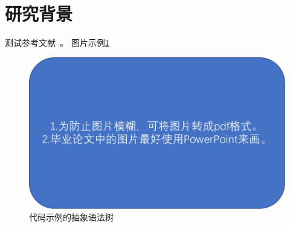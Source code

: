 \section{研究背景}
测试参考文献~\cite{ASE10Rule}。
图片示例\ref{fig:fig1}

\begin{figure}[htb]
    \centering
    \includegraphics[width=\textwidth]{image/fig1.pdf}
    \caption{代码示例的抽象语法树} 
    \label{fig:fig1} 
\end{figure}